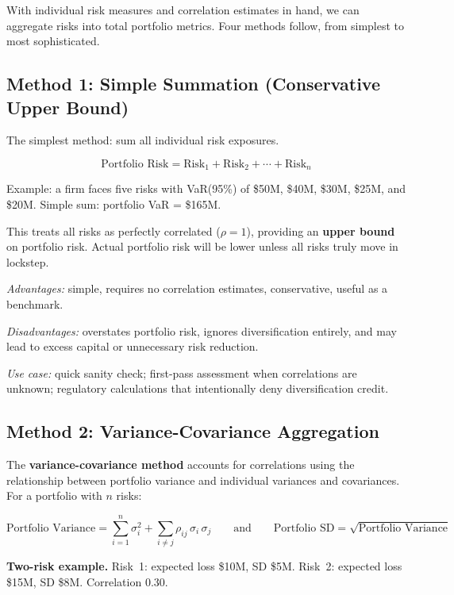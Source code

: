 \documentclass[11pt,openany]{book}
\begin{document}
With individual risk measures and correlation estimates in hand, we can
aggregate risks into total portfolio metrics. Four methods follow, from
simplest to most sophisticated.

\subsection{Method 1: Simple Summation (Conservative Upper Bound)}
\label{subsec:simple-summation}

The simplest method: sum all individual risk exposures.

\[
\text{Portfolio Risk} = \text{Risk}_1 + \text{Risk}_2 + \cdots + \text{Risk}_n
\]

Example: a firm faces five risks with VaR(95\%) of \$50M, \$40M, \$30M, \$25M,
and \$20M. Simple sum: portfolio VaR = \$165M.

This treats all risks as perfectly correlated (\(\rho = 1\)), providing an
\textbf{upper bound} on portfolio risk. Actual portfolio risk will be lower
unless all risks truly move in lockstep.

\emph{Advantages:} simple, requires no correlation estimates, conservative,
useful as a benchmark.

\emph{Disadvantages:} overstates portfolio risk, ignores diversification
entirely, and may lead to excess capital or unnecessary risk reduction.

\emph{Use case:} quick sanity check; first-pass assessment when correlations
are unknown; regulatory calculations that intentionally deny diversification
credit.

\subsection{Method 2: Variance-Covariance Aggregation}
\label{subsec:variance-covariance}

The \textbf{variance-covariance method} accounts for correlations using the
relationship between portfolio variance and individual variances and
covariances. For a portfolio with \(n\) risks:

\[
\text{Portfolio Variance}
  = \sum_{i=1}^{n} \sigma_i^2
  + \sum_{i \neq j} \rho_{ij}\,\sigma_i\,\sigma_j
\qquad\text{and}\qquad
\text{Portfolio SD} = \sqrt{\text{Portfolio Variance}}
\]

\textbf{Two-risk example.} Risk~1: expected loss \$10M, SD \$5M. Risk~2:
expected loss \$15M, SD \$8M. Correlation 0.30.
\end{document}
